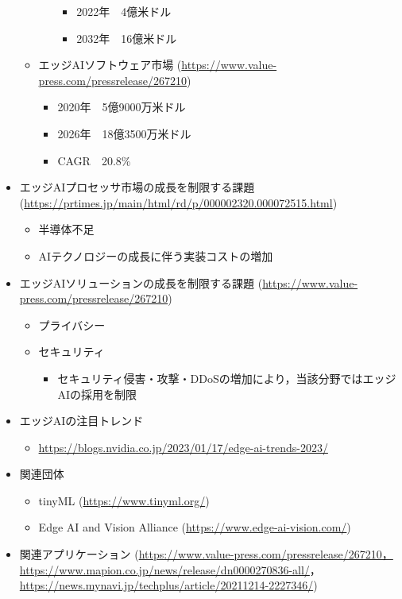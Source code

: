 \begin{itemize}
\begin{itemize}
\begin{itemize}
\begin{itemize}
				\item 2022年　4億米ドル
				\item 2032年　16億米ドル
			\end{itemize}
		\end{itemize}
		\item エッジAIソフトウェア市場 (\url{https://www.value-press.com/pressrelease/267210})
		\begin{itemize}
			\item 2020年　5億9000万米ドル
			\item 2026年　18億3500万米ドル
			\item CAGR　20.8\%
		\end{itemize}
	\end{itemize}
	\item エッジAIプロセッサ市場の成長を制限する課題 (\url{https://prtimes.jp/main/html/rd/p/000002320.000072515.html})
	\begin{itemize}
		\item 半導体不足
		\item AIテクノロジーの成長に伴う実装コストの増加
	\end{itemize}
	\item エッジAIソリューションの成長を制限する課題 (\url{https://www.value-press.com/pressrelease/267210})
	\begin{itemize}
		\item プライバシー
		\item セキュリティ
		\begin{itemize}
			\item セキュリティ侵害・攻撃・DDoSの増加により，当該分野ではエッジAIの採用を制限
		\end{itemize}
	\end{itemize}
	\item エッジAIの注目トレンド
	\begin{itemize}
		\item \url{https://blogs.nvidia.co.jp/2023/01/17/edge-ai-trends-2023/}
	\end{itemize}
	\item 関連団体
	\begin{itemize}
		\item tinyML (\url{https://www.tinyml.org/})
		\item Edge AI and Vision Alliance (\url{https://www.edge-ai-vision.com/})
	\end{itemize}
	\item 関連アプリケーション (\url{https://www.value-press.com/pressrelease/267210，https://www.mapion.co.jp/news/release/dn0000270836-all/}，\url{https://news.mynavi.jp/techplus/article/20211214-2227346/})

\end{itemize}
